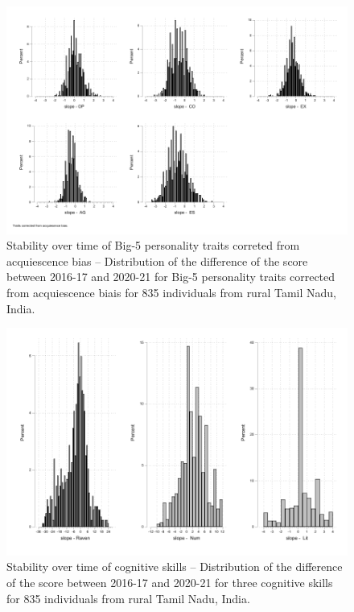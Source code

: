 \documentclass[a4paper, 11pt, onecolumn]{article}
\begin{document}
\begin{figure}[!htb]
\raggedright
\includegraphics[scale=0.86]{INPUT/diffcont_cor}
\caption{Stability over time of Big-5 personality traits correted from acquiescence bias -- Distribution of the difference of the score between 2016-17 and 2020-21 for Big-5 personality traits corrected from acquiescence biais for 835 individuals from rural Tamil Nadu, India.}
\label{fig:stabcor}
\end{figure}

\begin{figure}[!htb]
\raggedright
\includegraphics[scale=0.86]{INPUT/diffcont_cog}
\caption{Stability over time of cognitive skills -- Distribution of the difference of the score between 2016-17 and 2020-21 for three cognitive skills for 835 individuals from rural Tamil Nadu, India.}
\label{fig:stabcog}
\end{figure}
\end{document}
